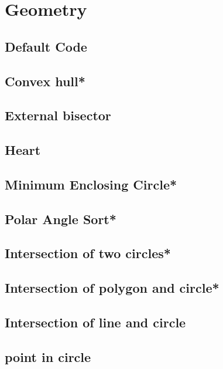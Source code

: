 \section{Geometry}
\subsection{Default Code}

\subsection{Convex hull*} %

\subsection{External bisector}

\subsection{Heart}

\subsection{Minimum Enclosing Circle*} %

\subsection{Polar Angle Sort*} %

\subsection{Intersection of two circles*} %

\subsection{Intersection of polygon and circle*} %

\subsection{Intersection of line and circle}

\subsection{point in circle}

